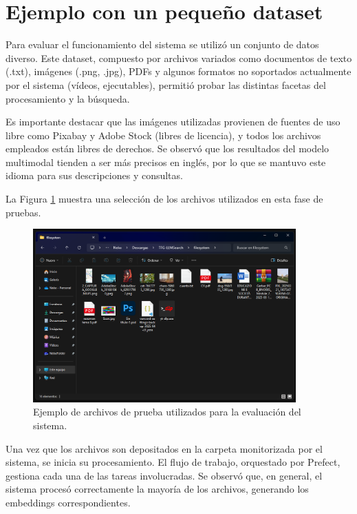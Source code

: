 \section{Ejemplo con un pequeño dataset}
\label{sec:ejemplo_dataset}

Para evaluar el funcionamiento del sistema se utilizó un conjunto de datos diverso. Este dataset, compuesto por archivos variados como documentos de texto (.txt), imágenes (.png, .jpg), PDFs y algunos formatos no soportados actualmente por el sistema (vídeos, ejecutables), permitió probar las distintas facetas del procesamiento y la búsqueda.

Es importante destacar que las imágenes utilizadas provienen de fuentes de uso libre como Pixabay y Adobe Stock (libres de licencia), y todos los archivos empleados están libres de derechos. Se observó que los resultados del modelo multimodal tienden a ser más precisos en inglés, por lo que se mantuvo este idioma para sus descripciones y consultas.

La Figura \ref{fig:result_files_dataset} muestra una selección de los archivos utilizados en esta fase de pruebas.

\begin{figure}[H]
\centering
\includegraphics[width=0.9\textwidth]{archivos/result_files.png}
\caption[Ejemplo de archivos de prueba]{Ejemplo de archivos de prueba utilizados para la evaluación del sistema.}
\label{fig:result_files_dataset}
\end{figure}

Una vez que los archivos son depositados en la carpeta monitorizada por el sistema, se inicia su procesamiento. El flujo de trabajo, orquestado por Prefect, gestiona cada una de las tareas involucradas. Se observó que, en general, el sistema procesó correctamente la mayoría de los archivos, generando los embeddings correspondientes.

